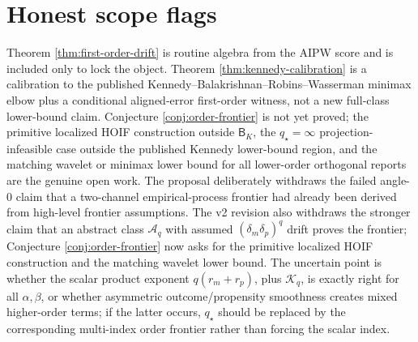 \documentclass[11pt]{article}
\theoremstyle{definition}
\theoremstyle{plain}
\theoremstyle{remark}
\begin{document}
\section{Honest scope flags}
Theorem \ref{thm:first-order-drift} is routine algebra from the AIPW score and
is included only to lock the object.  Theorem \ref{thm:kennedy-calibration}
is a calibration to the published Kennedy--Balakrishnan--Robins--Wasserman
minimax elbow plus a conditional aligned-error first-order witness, not a new
full-class lower-bound claim.  Conjecture
\ref{conj:order-frontier} is not yet proved; the primitive localized HOIF
construction outside \(\mathsf B_K\), the \(q_\star=\infty\)
projection-infeasible case outside the published Kennedy lower-bound region,
and the matching wavelet or minimax lower bound for all lower-order
orthogonal reports are the genuine open work.
The proposal deliberately withdraws the failed angle-0 claim that a
two-channel empirical-process frontier had already been derived from
high-level frontier assumptions.  The v2 revision also withdraws the stronger
claim that an abstract class \(\mathcal A_q\) with assumed
\((\delta_m\delta_p)^q\) drift proves the frontier; Conjecture
\ref{conj:order-frontier} now asks for the primitive localized HOIF
construction and the matching wavelet lower bound.  The uncertain point is
whether the scalar product exponent \(q(r_m+r_p)\), plus \(\mathcal K_q\), is
exactly right for all \(\alpha,\beta\), or whether asymmetric
outcome/propensity smoothness creates mixed higher-order terms; if the latter
occurs, \(q_\star\) should be replaced by the corresponding multi-index order
frontier rather than forcing the scalar index.
\end{document}
